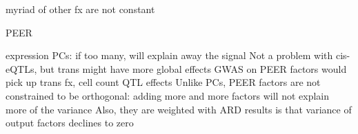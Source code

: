 myriad of other fx are not constant

PEER

%


%

expression PCs: if too many, will explain away the signal
Not a problem with cis-eQTLs, but trans might have more global effects
    GWAS on PEER factors would pick up trans fx, cell count QTL effects
Unlike PCs, PEER factors are not constrained to be orthogonal: adding more and more factors will not explain more of the variance
    Also, they are weighted with ARD 
    results is that variance of output factors declines to zero

